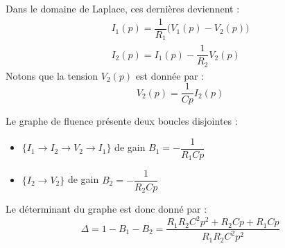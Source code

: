 Dans le domaine de Laplace, ces dernières deviennent :
\begin{align*}
    I_1(p)=\dfrac{1}{R_1}\big(V_1(p)-V_2(p)\big)\\
    I_2(p)=I_1(p)-\dfrac{1}{R_2}V_2(p)
\end{align*}
Notons que la tension $V_2(p)$ est donnée par :
\[
    V_2(p)=\dfrac{1}{Cp}I_2(p)
\]
\begin{center}
    
\end{center}
Le graphe de fluence présente deux boucles disjointes :
\begin{itemize}
    \item $\{I_1\rightarrow I_2\rightarrow V_2\rightarrow I_1\}$ 
          de gain $B_1=-\dfrac{1}{R_1Cp}$ 
    \item $\{I_2\rightarrow V_2\}$ de gain $B_2=-\dfrac{1}{R_2Cp}$ 
\end{itemize}
Le déterminant du graphe est donc donné par :
\[
    \Delta=1-B_1-B_2=\dfrac{R_1R_2C^2p^2+R_2Cp+R_1Cp}{R_1R_2C^2p^2}
\]

